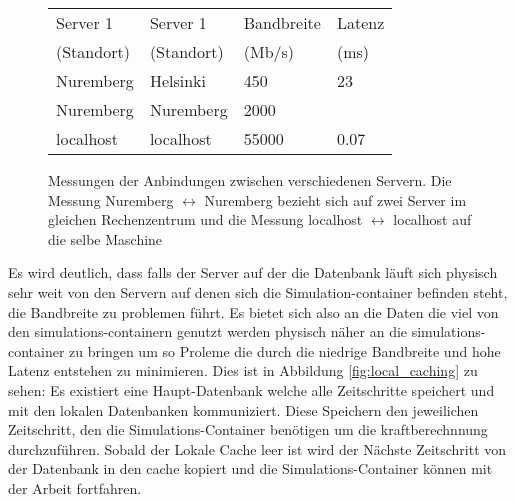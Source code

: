 \begin{figure}
\centering
\begin{tabular} {l | l | l | l}
Server 1 & Server 1 & Bandbreite & Latenz \\
(Standort) & (Standort) & (Mb/s) & (ms) \\ \hline\hline
Nuremberg & Helsinki & 450 & 23 \\ \hline
Nuremberg & Nuremberg & 2000 & \\ \hline
localhost & localhost & 55000 & 0.07 \\ \hline
\end{tabular}
\caption{Messungen der Anbindungen zwischen verschiedenen Servern. Die Messung
Nuremberg \( \leftrightarrow \) Nuremberg bezieht sich auf zwei Server im
gleichen Rechenzentrum und die Messung localhost \( \leftrightarrow \)
localhost auf die selbe Maschine}
\label{fig:bandwidth_latency}
\end{figure}

\par Es wird deutlich, dass falls der Server auf der die Datenbank läuft sich
physisch sehr weit von den Servern auf denen sich die Simulation-container
befinden steht, die Bandbreite zu problemen führt. Es bietet sich also an die
Daten die viel von den simulations-containern genutzt werden physisch näher an
die simulations-container zu bringen um so Proleme die durch die niedrige
Bandbreite und hohe Latenz entstehen zu minimieren. Dies ist in Abbildung
\ref{fig:local_caching} zu sehen: Es existiert eine Haupt-Datenbank welche alle
Zeitschritte speichert und mit den lokalen Datenbanken kommuniziert. Diese
Speichern den jeweilichen Zeitschritt, den die Simulations-Container benötigen
um die kraftberechnnung durchzuführen. Sobald der Lokale Cache leer ist wird
der Nächste Zeitschritt von der Datenbank in den cache kopiert und die
Simulations-Container können mit der Arbeit fortfahren.

